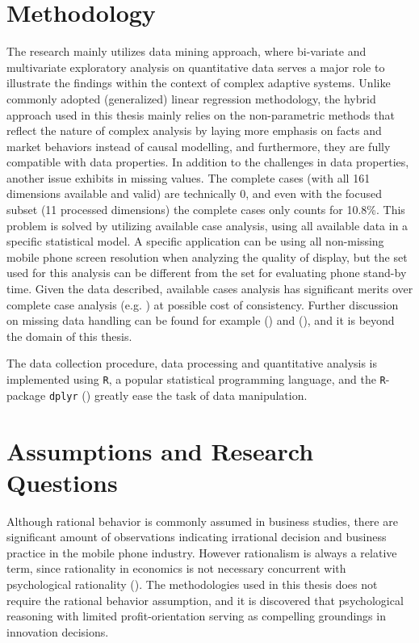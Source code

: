\documentclass[utf8,english]{gradu3}
\begin{document}
\section{Methodology}

The research mainly utilizes data mining approach, where bi-variate and multivariate exploratory analysis on quantitative data  serves a major role to illustrate the findings within the context of complex adaptive systems. Unlike commonly adopted (generalized) linear regression methodology, the hybrid approach used in this thesis mainly relies on the non-parametric methods that reflect the nature of complex analysis by laying more emphasis on facts and market behaviors instead of causal modelling, and furthermore, they are fully compatible with data properties. In addition to the challenges in data properties, another issue exhibits in missing values. The complete cases (with all 161 dimensions available and valid) are technically 0, and even with the focused subset (11 processed dimensions) the complete cases only counts for 10.8\%. This problem is solved by utilizing available case analysis, using all available data in a specific statistical model. A specific application can be using all non-missing mobile phone screen resolution when analyzing the quality of display, but the set used for this analysis can be different from the set for evaluating phone stand-by time. Given the data described, available cases analysis has significant merits over complete case analysis (e.g. \cite{kim1977treatment}) at possible cost of consistency. Further discussion on missing data handling can be found for example \citeauthor{little2014statistical} (\citeyear{little2014statistical}) and \citeauthor{pigott2001review} (\citeyear{pigott2001review}), and it is beyond the domain of this thesis.

The data collection procedure, data processing and quantitative analysis is implemented using \texttt{R}, a popular statistical programming language, and the \texttt{R}-package \texttt{dplyr} (\cite{dplyr}) greatly ease the task of data manipulation.

\section{Assumptions and Research Questions}

Although rational behavior is commonly assumed in business studies, there are significant amount of observations indicating irrational decision and business practice in the mobile phone industry. However rationalism is always a relative term, since rationality in economics is not necessary concurrent with psychological rationality (\cite{hogarth1987rational}). The methodologies used in this thesis does not require the rational behavior assumption, and it is discovered that psychological reasoning with limited profit-orientation serving as compelling groundings in innovation decisions.
\end{document}
